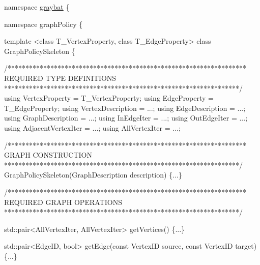 \begin{DoxyCode}
\textcolor{keyword}{namespace }\hyperlink{namespacegraybat}{graybat} \{

        \textcolor{keyword}{namespace }graphPolicy \{

                \textcolor{keyword}{template} <\textcolor{keyword}{class} T\_VertexProperty, \textcolor{keyword}{class} T\_EdgeProperty>
                \textcolor{keyword}{class }GraphPolicySkeleton \{

                        \textcolor{comment}{/*******************************************************************}
\textcolor{comment}{                           REQUIRED TYPE DEFINITIONS}
\textcolor{comment}{                         ******************************************************************/}
                        \textcolor{keyword}{using} VertexProperty     = T\_VertexProperty;
                        \textcolor{keyword}{using} EdgeProperty       = T\_EdgeProperty;
                        \textcolor{keyword}{using} VertexDescription  = ...;
                        \textcolor{keyword}{using} EdgeDescription    = ...;
                        \textcolor{keyword}{using} GraphDescription   = ...;
                        \textcolor{keyword}{using} InEdgeIter         = ...;
                        \textcolor{keyword}{using} OutEdgeIter        = ...;
                        \textcolor{keyword}{using} AdjacentVertexIter = ...;
                        \textcolor{keyword}{using} AllVertexIter      = ...;

                        \textcolor{comment}{/*******************************************************************}
\textcolor{comment}{                           GRAPH CONSTRUCTION}
\textcolor{comment}{                         ******************************************************************/}
                        GraphPolicySkeleton(GraphDescription description) \{...\}

                        \textcolor{comment}{/*******************************************************************}
\textcolor{comment}{                           REQUIRED GRAPH OPERATIONS}
\textcolor{comment}{                         ******************************************************************/}

                        std::pair<AllVertexIter, AllVertexIter> getVertices() \{...\}

                        std::pair<EdgeID, bool> getEdge(\textcolor{keyword}{const} VertexID source, \textcolor{keyword}{const} VertexID target) \{...\}
       


\end{DoxyCode}
